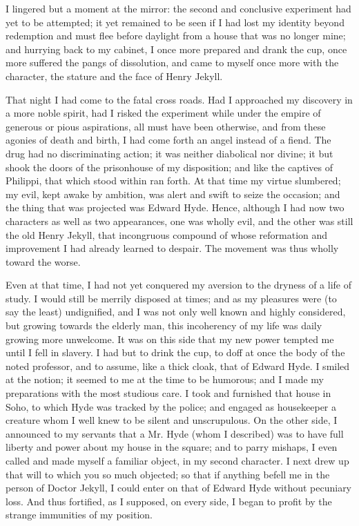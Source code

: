 \documentclass[]{novel}
\begin{document}
I lingered but a moment at the mirror: the second and conclusive experiment had yet to be attempted; it yet remained to be seen if I had lost my identity beyond redemption and must flee before daylight from a house that was no longer mine; and hurrying back to my cabinet, I once more prepared and drank the cup, once more suffered the pangs of dissolution, and came to myself once more with the character, the stature and the face of Henry Jekyll.

That night I had come to the fatal cross roads. Had I approached my discovery in a more noble spirit, had I risked the experiment while under the empire of generous or pious aspirations, all must have been otherwise, and from these agonies of death and birth, I had come forth an angel instead of a fiend. The drug had no discriminating action; it was neither diabolical nor divine; it but shook the doors of the prisonhouse of my disposition; and like the captives of Philippi, that which stood within ran forth. At that time my virtue slumbered; my evil, kept awake by ambition, was alert and swift to seize the occasion; and the thing that was projected was Edward Hyde. Hence, although I had now two characters as well as two appearances, one was wholly evil, and the other was still the old Henry Jekyll, that incongruous compound of whose reformation and improvement I had already learned to despair. The movement was thus wholly toward the worse.

Even at that time, I had not yet conquered my aversion to the dryness of a life of study. I would still be merrily disposed at times; and as my pleasures were (to say the least) undignified, and I was not only well known and highly considered, but growing towards the elderly man, this incoherency of my life was daily growing more unwelcome. It was on this side that my new power tempted me until I fell in slavery. I had but to drink the cup, to doff at once the body of the noted professor, and to assume, like a thick cloak, that of Edward Hyde. I smiled at the notion; it seemed to me at the time to be humorous; and I made my preparations with the most studious care. I took and furnished that house in Soho, to which Hyde was tracked by the police; and engaged as housekeeper a creature whom I well knew to be silent and unscrupulous. On the other side, I announced to my servants that a Mr. Hyde (whom I described) was to have full liberty and power about my house in the square; and to parry mishaps, I even called and made myself a familiar object, in my second character. I next drew up that will to which you so much objected; so that if anything befell me in the person of Doctor Jekyll, I could enter on that of Edward Hyde without pecuniary loss. And thus fortified, as I supposed, on every side, I began to profit by the strange immunities of my position.
\end{document}
